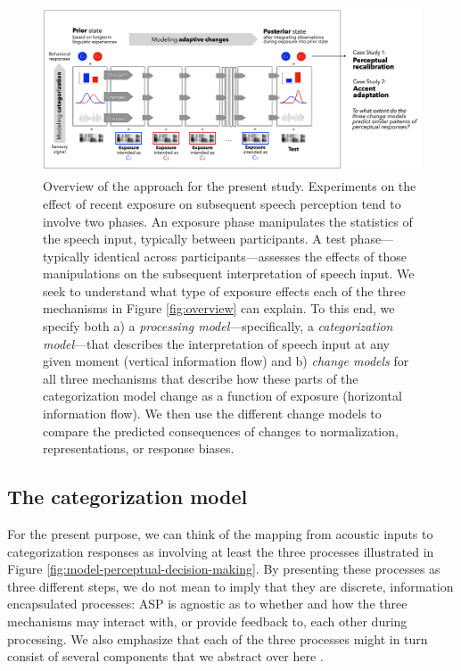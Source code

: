 \documentclass[
  11pt,
  man,floatsintext]{apa6}
\begin{document}
\begin{figure}[h]
\begin{center}
\includegraphics[width=.99\columnwidth]{../figures/diagrams/overview-of-changes.png}
\caption{Overview of the approach for the present study. Experiments on the effect of recent exposure on subsequent speech perception tend to involve two phases. An exposure phase manipulates the statistics of the speech input, typically between participants. A test phase---typically identical across participants---assesses the effects of those manipulations on the subsequent interpretation of speech input. We seek to understand what type of exposure effects each of the three mechanisms in Figure \ref{fig:overview} can explain. To this end, we specify both a) a {\em processing model}---specifically, a {\em categorization model}---that describes the interpretation of speech input at any given moment (vertical information flow) and b) {\em change models} for all three mechanisms that describe how these parts of the categorization model change as a function of exposure (horizontal information flow). We then use the different change models to compare the predicted consequences of changes to normalization, representations, or response biases.}\label{fig:overview-change}
\end{center}
\end{figure}

\subsection{The categorization model}\label{the-categorization-model}

For the present purpose, we can think of the mapping from acoustic inputs to categorization responses as involving at least the three processes illustrated in Figure \ref{fig:model-perceptual-decision-making}. By presenting these processes as three different steps, we do not mean to imply that they are discrete, information encapsulated processes: ASP is agnostic as to whether and how the three mechanisms may interact with, or provide feedback to, each other during processing. We also emphasize that each of the three processes might in turn consist of several components that we abstract over here \autocite[e.g., multiple different levels of normalization, cf.~discussion in][]{barreda2020}.
\end{document}

